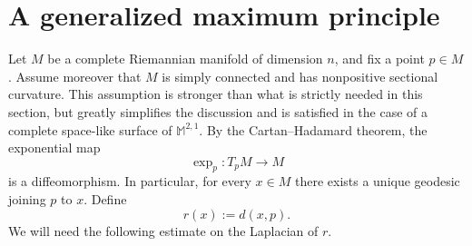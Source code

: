 \documentclass[a4paper,11pt,openright,twoside]{book}
\newcommand{\M}{\mathbb{M}^{2,1}}
\newcommand{\1}{\mathds{1}}
\theoremstyle{plain}
\theoremstyle{definition}
\theoremstyle{remark}
\begin{document}
\section{A generalized maximum principle}
Let $M$ be a complete Riemannian manifold of dimension $n$, and fix a point $p\in M$. Assume moreover that $M$ is simply connected and has nonpositive sectional curvature. This assumption is stronger than what is strictly needed in this section, but greatly simplifies the discussion and is satisfied in the case of a complete space-like surface of $\M$. By the Cartan--Hadamard theorem, the exponential map
\[
\exp_p:T_pM\to M
\]
is a diffeomorphism. In particular, for every $x\in M$ there exists a unique geodesic joining $p$ to $x$. Define
\[
r(x):=d(x,p).
\]
We will need the following estimate on the Laplacian of $r$.
\end{document}
